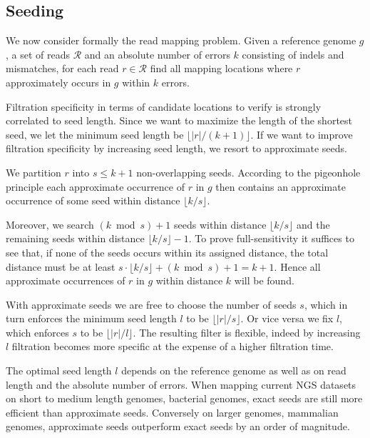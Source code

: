 \subsection{Seeding}

We now consider formally the read mapping problem.
Given a reference genome $g$, a set of reads $\mathcal{R}$ and an absolute number of errors $k$ consisting of indels and mismatches, for each read $r \in \mathcal{R}$ find all mapping locations where $r$ approximately occurs in $g$ within $k$ errors.

Filtration specificity in terms of candidate locations to verify is strongly correlated to seed length.
Since we want to maximize the length of the shortest seed, we let the minimum seed length be $\lfloor |r|/(k+1) \rfloor$.
If we want to improve filtration specificity by increasing seed length, we resort to approximate seeds.

We partition $r$ into $s \leq k+1$ non-overlapping seeds.
According to the pigeonhole principle each approximate occurrence of $r$ in $g$ then contains an approximate occurrence of some seed within distance $\lfloor k/s \rfloor$.

Moreover, we search $(k \bmod{s}) + 1$ seeds within distance $\lfloor k/s \rfloor$ and the remaining seeds within distance $\lfloor k/s \rfloor - 1$.
To prove full-sensitivity it suffices to see that, if none of the seeds occurs within its assigned distance, the total distance must be at least $s \cdot \lfloor k/s \rfloor + (k \bmod s) + 1 = k + 1$.
Hence all approximate occurrences of $r$ in $g$ within distance $k$ will be found.

With approximate seeds we are free to choose the number of seeds $s$, which in turn enforces the minimum seed length $l$ to be $\lfloor |r|/s \rfloor$.
Or vice versa we fix $l$, which enforces $s$ to be $\lfloor |r|/l \rfloor$.
The resulting filter is flexible, indeed by increasing $l$ filtration becomes more specific at the expense of a higher filtration time.

The optimal seed length $l$ depends on the reference genome as well as on read length and the absolute number of errors.
When mapping current NGS datasets on short to medium length genomes, \eg bacterial genomes, exact seeds are still more efficient than approximate seeds.
Conversely on larger genomes, \eg mammalian genomes, approximate seeds outperform exact seeds by an order of magnitude.

